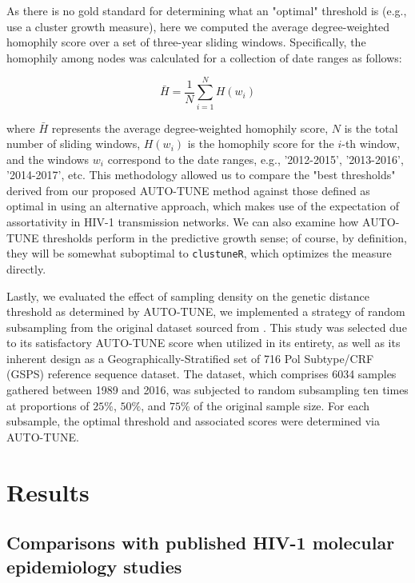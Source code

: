 \documentclass[utf8]{FrontiersinHarvard} %
\begin{document}
As there is no gold standard for determining what an "optimal" threshold is
(e.g., \citet{chato_public_2020} use a cluster growth measure), here we
computed the average degree-weighted homophily score over a set of three-year
sliding windows. Specifically, the homophily among nodes was calculated for a
collection of date ranges as follows:

\begin{equation} \bar{H} = \frac{1}{N}\sum_{i=1}^{N} H(w_i) \end{equation}

where $\bar{H}$ represents the average degree-weighted homophily score, $N$ is
the total number of sliding windows, $H(w_i)$ is the homophily score for the
$i$-th window, and the windows $w_i$ correspond to the date ranges, e.g.,
'2012-2015', '2013-2016', '2014-2017', etc. This methodology allowed us to
compare the "best thresholds" derived from our proposed AUTO-TUNE method
against those defined as optimal in \citep{chato_public_2020} using an
alternative approach, which makes use of the expectation of assortativity in
HIV-1 transmission networks. We can also examine how AUTO-TUNE thresholds
perform in the predictive growth sense; of course, by definition, they will be
somewhat suboptimal to {\tt clustuneR}, which optimizes the measure directly.

Lastly, we evaluated the effect of sampling density on the genetic distance
threshold as determined by AUTO-TUNE, we implemented a strategy of random
subsampling from the original dataset sourced from \citep{rhee_national_2019}.
This study was selected due to its satisfactory AUTO-TUNE score when utilized
in its entirety, as well as its inherent design as a Geographically-Stratified
set of 716 Pol Subtype/CRF (GSPS) reference sequence dataset. The dataset,
which comprises 6034 samples gathered between 1989 and 2016, was subjected to
random subsampling ten times at proportions of $25\%$, $50\%$, and $75\%$ of
the original sample size. For each subsample, the optimal threshold and
associated scores were determined via AUTO-TUNE.

\section{Results}

\subsection{Comparisons with published HIV-1 molecular epidemiology studies}
\end{document}
